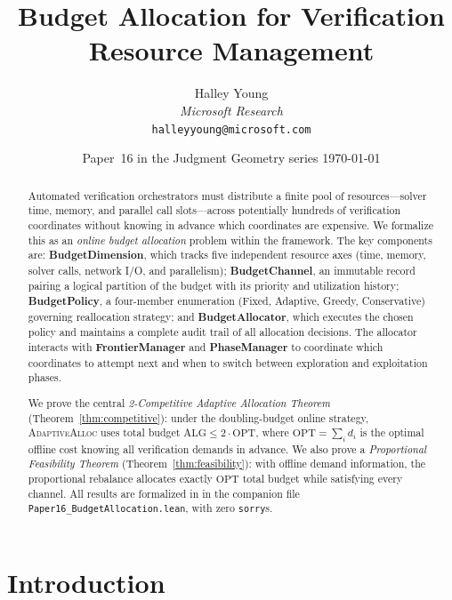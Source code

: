 \documentclass[11pt]{article}
\title{\textbf{Budget Allocation for Verification Resource Management}}
\author{%
  Halley Young\\
  \textit{Microsoft Research}\\
  \texttt{halleyyoung@microsoft.com}
}
\date{Paper~16 in the Judgment Geometry series \quad \today}
\providecommand{\OPT}{\mathrm{OPT}}           %
\providecommand{\ALG}{\mathrm{ALG}}           %
\providecommand{\AdaptAlloc}{\textsc{AdaptiveAlloc}}   %
\begin{document}
\maketitle

\begin{abstract}
Automated verification orchestrators must distribute a finite pool of
resources---solver time, memory, and parallel call slots---across
potentially hundreds of verification coordinates without knowing in
advance which coordinates are expensive.  We formalize this as an
\emph{online budget allocation} problem within the \JuGeo{}
framework.  The key components are: \textbf{BudgetDimension}, which
tracks five independent resource axes (time, memory, solver calls,
network I/O, and parallelism); \textbf{BudgetChannel}, an immutable
record pairing a logical partition of the budget with its priority and
utilization history; \textbf{BudgetPolicy}, a four-member enumeration
(Fixed, Adaptive, Greedy, Conservative) governing reallocation
strategy; and \textbf{BudgetAllocator}, which executes the chosen
policy and maintains a complete audit trail of all allocation
decisions.  The allocator interacts with \textbf{FrontierManager}
and \textbf{PhaseManager} to coordinate which coordinates to attempt
next and when to switch between exploration and exploitation phases.

We prove the central \emph{2-Competitive Adaptive Allocation Theorem}
(Theorem~\ref{thm:competitive}): under the doubling-budget online
strategy, \AdaptAlloc{} uses total budget $\ALG \le 2 \cdot \OPT$,
where $\OPT = \sum_i d_i$ is the optimal offline cost knowing all
verification demands in advance.  We also prove a
\emph{Proportional Feasibility Theorem}
(Theorem~\ref{thm:feasibility}): with offline demand information,
the proportional rebalance allocates exactly $\OPT$ total budget
while satisfying every channel.  All results are formalized in
\LEAN{} in the companion file
\texttt{Paper16\_BudgetAllocation.lean}, with zero \texttt{sorry}s.
\end{abstract}

\newpage

\section{Introduction}\label{sec:intro}
\end{document}
